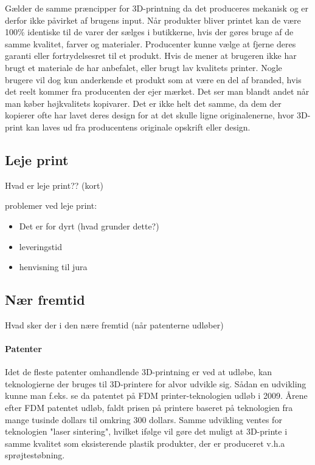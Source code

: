 Gælder de samme præncipper for 3D-printning da det produceres mekanisk og er derfor ikke påvirket af brugens input. Når produkter bliver printet kan de være 100\% identiske til de varer der sælges i butikkerne, hvis der gøres bruge af de samme kvalitet, farver og materialer.
Producenter kunne vælge at fjerne deres garanti eller fortrydelsesret til et produkt. Hvis de mener at brugeren ikke har brugt et materiale de har anbefalet, eller brugt lav kvalitets printer.
Nogle brugere vil dog kun anderkende et produkt som at være en del af branded, hvis det reelt kommer fra producenten der ejer mærket. Det ser man blandt andet når man køber højkvalitets kopivarer.\autocite{_vi_????}
Det er ikke helt det samme, da dem der kopierer ofte har lavet deres design for at det skulle ligne originalenerne, hvor 3D-print kan laves ud fra producentens originale opskrift eller design.



\subsection{Leje print} %
\label{sub:leje_print}

Hvad er leje print?? (kort)


problemer ved leje print:

\begin{itemize}
	\item Det er for dyrt (hvad grunder dette?)
	\item leveringstid
	\item henvisning til jura
\end{itemize}


\subsection{Nær fremtid} %
\label{sub:f_lles_problemer}

Hvad sker der i den nære fremtid (når patenterne udløber)



\paragraph{Patenter} %

Idet de fleste patenter omhandlende 3D-printning er ved at udløbe, kan teknologierne der bruges til 3D-printere for alvor udvikle sig. Sådan en udvikling kunne man f.eks. se da patentet på FDM printer-teknologien udløb i 2009. \autocite{manyika_disruptive_2013} Årene efter FDM patentet udløb, faldt prisen på printere baseret på teknologien fra mange tusinde dollars til omkring 300 dollars. \autocite{mims_3d_2013} Samme udvikling ventes for teknologien "laser sintering", hvilket ifølge \autocite{mims_3d_2013} vil gøre det muligt at 3D-printe i samme kvalitet som eksisterende plastik produkter, der er produceret v.h.a sprøjtestøbning.

